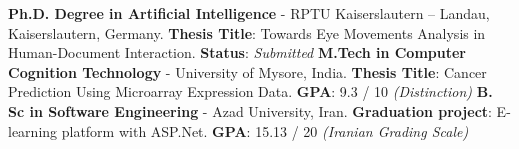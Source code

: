 %
%
%


\begin{scholarship}
	{
		\textbf{Ph.D. Degree in Artificial Intelligence} - RPTU Kaiserslautern -- Landau, Kaiserslautern, Germany. \newline
		\textbf{Thesis Title}: Towards Eye Movements Analysis in Human-Document Interaction. \newline
		\textbf{Status}: \textit{Submitted} \newline
	}
	{
		\textbf{M.Tech in Computer Cognition Technology} - University of Mysore, India. \newline
		\textbf{Thesis Title}: Cancer Prediction Using Microarray Expression Data. \newline
		\textbf{GPA}: 9.3 / 10 \textit{(Distinction) }\newline
	}
	{
		\textbf{B. Sc in Software Engineering} - Azad University, Iran. \newline
		\textbf{Graduation project}: E-learning platform with ASP.Net. \newline
		\textbf{GPA}: 15.13 / 20 \textit{(Iranian Grading Scale)}  \newline
	}
\end{scholarship}